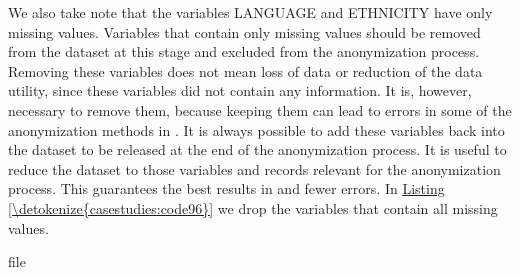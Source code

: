 \documentclass[letterpaper,10pt,english]{sphinxmanual}
\begin{document}
\def\sphinxLiteralBlockLabel{\label{\detokenize{casestudies:code95}}}
%
\begin{sphinxVerbatim}[commandchars=\\\{\},numbers=left,firstnumber=1,stepnumber=1]
\PYG{p}{[}\PYG{p}{]}\PYG{p}{[}\PYG{p}{[}\PYG{p}{]}  \PYG{p}{]}         
\PYG{p}{[}\PYG{p}{]}\PYG{p}{[}\PYG{p}{[}\PYG{p}{]}  \PYG{p}{]}        
\PYG{p}{[}\PYG{p}{]}\PYG{p}{[}\PYG{p}{[}\PYG{p}{]}  \PYG{p}{]}  
\end{sphinxVerbatim}

We also take note that the variables LANGUAGE and ETHNICITY have only
missing values. Variables that contain only missing values should be
removed from the dataset at this stage and excluded from the
anonymization process. Removing these variables does not mean loss of
data or reduction of the data utility, since these variables did not
contain any information. It is, however, necessary to remove them,
because keeping them can lead to errors in some of the anonymization
methods in . It is always possible to add these variables back into
the dataset to be released at the end of the anonymization process. It
is useful to reduce the dataset to those variables and records relevant
for the anonymization process. This guarantees the best results in 
and fewer errors. In \hyperref[\detokenize{casestudies:code96}]{Listing \ref{\detokenize{casestudies:code96}}} we drop the variables that contain all
missing values.

\def\sphinxLiteralBlockLabel{\label{\detokenize{casestudies:code96}}}
%
\begin{sphinxVerbatim}[commandchars=\\\{\},numbers=left,firstnumber=1,stepnumber=1]
file  \PYG{p}{[}   \PYG{p}{]}
\end{sphinxVerbatim}
\end{document}
